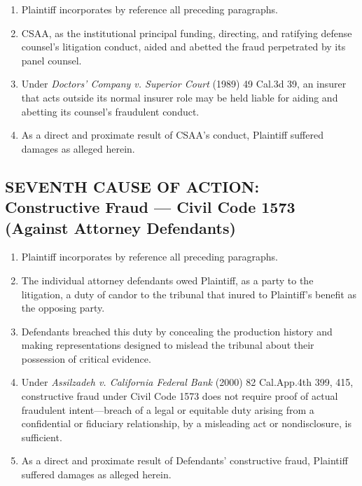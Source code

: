 \begin{enumerate}
\def\labelenumi{\arabic{enumi}.}
\setcounter{enumi}{71}
\item
  Plaintiff incorporates by reference all preceding paragraphs.
\item
  CSAA, as the institutional principal funding, directing, and ratifying defense counsel's litigation conduct, aided and abetted the fraud perpetrated by its panel counsel.
\item
  Under \emph{Doctors' Company v. Superior Court} (1989) 49 Cal.3d 39, an insurer that acts outside its normal insurer role may be held liable for aiding and abetting its counsel's fraudulent conduct.
\item
  As a direct and proximate result of CSAA's conduct, Plaintiff suffered damages as alleged herein.
\end{enumerate}

\subsection{SEVENTH CAUSE OF ACTION: Constructive Fraud --- Civil Code \textsection{} 1573 (Against Attorney Defendants)}\label{seventh-cause-of-action-constructive-fraud-civil-code-1573-against-attorney-defendants}

\begin{enumerate}
\def\labelenumi{\arabic{enumi}.}
\setcounter{enumi}{75}
\item
  Plaintiff incorporates by reference all preceding paragraphs.
\item
  The individual attorney defendants owed Plaintiff, as a party to the litigation, a duty of candor to the tribunal that inured to Plaintiff's benefit as the opposing party.
\item
  Defendants breached this duty by concealing the production history and making representations designed to mislead the tribunal about their possession of critical evidence.
\item
  Under \emph{Assilzadeh v. California Federal Bank} (2000) 82 Cal.App.4th 399, 415, constructive fraud under Civil Code \textsection{} 1573 does not require proof of actual fraudulent intent---breach of a legal or equitable duty arising from a confidential or fiduciary relationship, by a misleading act or nondisclosure, is sufficient.
\item
  As a direct and proximate result of Defendants' constructive fraud, Plaintiff suffered damages as alleged herein.
\end{enumerate}

